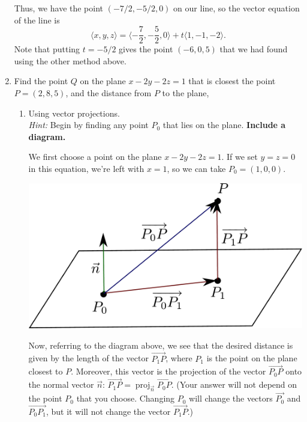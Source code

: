 \documentclass[12pt]{article}
\DeclareMathOperator{\proj}{proj}
\begin{document}
\begin{enumerate}
Thus, we have the point $(-7/2,-5/2,0)$ on our line, so the vector equation of the line is
\[
\langle x,y,z\rangle = \langle -\frac72,-\frac52,0\rangle + t\langle 1,-1,-2\rangle.
\]
Note that putting $t=-5/2$ gives the point $(-6,0,5)$ that we had found using the other method above.

\pagebreak

\item Find the point $Q$ on the plane $x-2y-2z=1$ that is closest the point $P=(2,8,5)$, and the distance from $P$ to the plane,
\begin{enumerate}
\item Using vector projections.\\
{\em Hint:} Begin by finding any point $P_0$ that lies on the plane. {\bf Include a diagram.}

\bigskip

\begin{multicols}{2}
We first choose a point on the plane $x-2y-2z=1$. If we set $y=z=0$ in this equation, we're left with $x=1$, so we can take $P_0=(1,0,0)$.  
\columnbreak

\begin{center}
 \includegraphics[width=0.8\columnwidth]{WS3-4}
\end{center}
\end{multicols}
Now, referring to the diagram above, we see that the desired distance is given by the length of the vector $\overrightarrow{P_1P}$, where $P_1$ is the point on the plane closest to $P$. Moreover, this vector is the projection of the vector $\overrightarrow{P_0P}$ onto the normal vector $\vec{n}$: $\overrightarrow{P_1P} = \proj_{\vec{n}}\overrightarrow{P_0P}$. (Your answer will not depend on the point $P_0$ that you choose. Changing $P_0$ will change the vectors $\overrightarrow{P_0}$ and $\overrightarrow{P_0P_1}$, but it will not change the vector $\overrightarrow{P_1P}$.)


\end{enumerate}
\end{enumerate}
\end{document}
